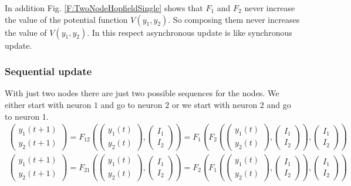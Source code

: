   In addition Fig. \ref{F:TwoNodeHopfieldSingle} shows that $F_1$ and $F_2$ 
never increase the value of the potential function $V(y_1,y_2)$.  So composing 
them never increases the value of $V(y_1,y_2)$.  In this respect asynchronous
update is like synchronous update.

\subsubsection{Sequential update} 

  With just two nodes there are just two possible sequences for the nodes.
We either start with neuron $1$ and go to neuron $2$ or we start with neuron 
$2$ and go to neuron $1$.  
\begin{eqnarray*}
\begin{pmatrix}
y_1(t+1) \\ y_2(t+1)
\end{pmatrix}
= 
F_{12}
\left(
\begin{pmatrix}
y_1(t) \\ y_2(t)
\end{pmatrix},
\begin{pmatrix}
I_1 \\ I_2
\end{pmatrix}
\right)
=
F_1
\left(
F_2
\left(
\begin{pmatrix}
y_1(t) \\ y_2(t)
\end{pmatrix},
\begin{pmatrix}
I_1 \\ I_2
\end{pmatrix}
\right),
\begin{pmatrix}
I_1 \\ I_2
\end{pmatrix}
 \right) \\
\begin{pmatrix}
y_1(t+1) \\ y_2(t+1)
\end{pmatrix}
= 
F_{21}
\left(
\begin{pmatrix}
y_1(t) \\ y_2(t)
\end{pmatrix},
\begin{pmatrix}
I_1 \\ I_2
\end{pmatrix}
\right)
=
F_2
\left(
F_1
\left(
\begin{pmatrix}
y_1(t) \\ y_2(t)
\end{pmatrix},
\begin{pmatrix}
I_1 \\ I_2
\end{pmatrix}
\right),
\begin{pmatrix}
I_1 \\ I_2
\end{pmatrix}
 \right)
\end{eqnarray*}
